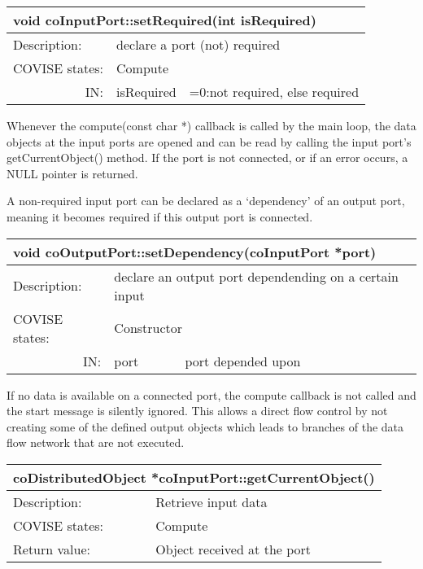 \begin{longtable}{|p{4cm}|p{2.5cm}|p{7cm}|}
\hline
\multicolumn{3}{|p{13.5cm}|}{\bf void coInputPort::setRequired(int isRequired)} \\
\hline
{Description:}   & 
                        \multicolumn{2}{|p{9.5cm}|}{declare a port (not) required} \\
\hline
{COVISE states:} & \multicolumn{2}{|p{9.5cm}|}{Compute} \\
\hline
\multicolumn{1}{|r|}{IN:}  & {isRequired} & 
                        {=0:not required, else required} \endhead
\hline
\end{longtable}

Whenever the compute(const char *) callback is called by the main loop, the data objects at the 
input ports are opened and can be read by calling the input port's getCurrentObject() method. 
If the port is not connected, or if an error occurs, a NULL pointer is returned.

A non-required input port can be declared as a `dependency' of an output port, meaning 
it becomes required if this output port is connected.

\begin{longtable}{|p{4cm}|p{2.5cm}|p{7cm}|}
\hline
\multicolumn{3}{|p{13.5cm}|}{\bf void coOutputPort::setDependency(coInputPort *port)} \\
\hline
{Description:}   & 
              \multicolumn{2}{|p{9.5cm}|}{declare an output port dependending on a certain input} \\
\hline
{COVISE states:} & \multicolumn{2}{|p{9.5cm}|}{Constructor} \\
\hline
\multicolumn{1}{|r|}{IN:}  & {port} & 
                        {port depended upon} \\
\hline
\end{longtable}

If no data is available on a connected port, the compute callback is not called and 
the start message is silently ignored. This allows a direct flow control by not creating
some of the defined output objects which leads to branches of the data flow network 
that are not executed.  

\begin{longtable}{|p{4cm}|p{10cm}|}
\hline
\multicolumn{2}{|p{13.5cm}|}{\bf coDistributedObject *coInputPort::getCurrentObject()} \\
\hline
{Description:}   & {Retrieve input data} \\
\hline
{COVISE states:} & {Compute} \\
\hline
{Return value:}  & {Object received at the port} \endhead
\hline
\end{longtable}

